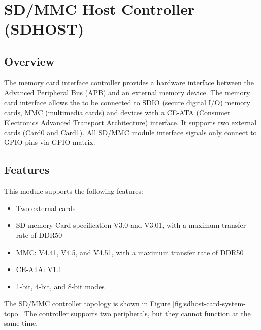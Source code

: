\documentclass[main\_\_EN.tex]{subfiles}
\begin{document}

\ifglobal
\else
    {\let\clearpage\relax \listoftodos}
    {\let\clearpage\relax \listofdonetodos}
    \tableofcontents
\fi



\hypertarget{sdhost}{}
\chapter{SD/MMC Host Controller (SDHOST)}
\label{mod:sdhost}


\section{Overview}

The \chipname{} memory card interface controller provides a hardware interface between the Advanced Peripheral Bus (APB) and an external memory device. The memory card interface allows the \chipname{} to be connected to SDIO (secure digital I/O) memory cards, MMC (multimedia cards) and devices with a CE-ATA (Consumer Electronics Advanced Transport Architecture) interface. It supports two external cards (Card0 and Card1).
All SD/MMC module interface signals only connect to GPIO pins via GPIO matrix.

\section{Features}
This module supports the following features:

\begin{itemize}
    \item Two external cards
    \item SD memory Card specification V3.0 and V3.01, with a maximum transfer rate of DDR50
    \item MMC: V4.41, V4.5, and V4.51, with a maximum transfer rate of DDR50
    \item CE-ATA: V1.1
    \item 1-bit, 4-bit, and 8-bit modes
\end{itemize}

The SD/MMC controller topology is shown in Figure \ref{fig:sdhost-card-system-topo}. The controller supports two peripherals, but they cannot function at the same time. 
\end{document}
